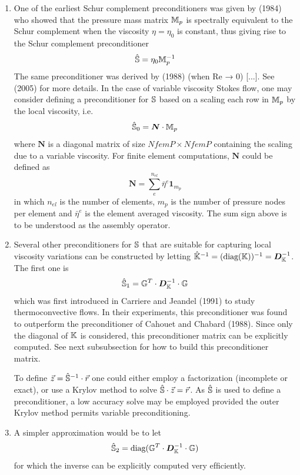 \begin{enumerate}
\item One of the earliest Schur complement preconditioners was given by 
\textcite{verf84} (1984) who showed that the pressure mass matrix 
${\mathbb{M}}_p$ is spectrally equivalent to the Schur complement when the viscosity 
$\eta=\eta_0$ is constant, thus giving rise to the Schur complement preconditioner
\[
\hat{{\mathbb{S}}}=\eta_0 {\mathbb{M}}_p^{-1}
\]
The same preconditioner was derived by \textcite{cach88} (1988) (when Re → 0) [...]. 
See \textcite{begl05} (2005) for more details. In the case of variable viscosity 
Stokes flow, one may consider defining a preconditioner 
for ${\mathbb{S}}$ based on a scaling each row in ${\mathbb{M}}_p$ by the local viscosity, i.e.
\[
\hat{{\mathbb{S}}}_0={\bm N} \cdot {\mathbb{M}}_p
\]
where ${\bm N}$ is a diagonal matrix of size $NfemP \times NfemP$ containing the scaling due to
a variable viscosity. For finite element computations, ${\bm N}$ could be defined as
\[
{\bm N} = \sum_e^{n_{el}} \bar{\eta}^e {\bm 1}_{m_p} 
\]
in which $n_{el}$ is the number of elements, $m_p$ is the number of pressure nodes per 
element and $ \bar{\eta}^e$ is the element averaged viscosity. The sum sign above is 
to be understood as the assembly operator.

\item Several other preconditioners for ${\mathbb{S}}$ that are suitable for capturing 
local viscosity variations can be constructed by letting 
$\hat{{\mathbb{K}}}^{-1}=(\text{diag}({\mathbb{K}}))^{-1} ={\bm D}_{\mathbb{K}}^{-1}$.
The first one is 
\[
\hat{{\mathbb{S}}}_1={\mathbb{G}}^T \cdot {\bm D}_{\mathbb{K}}^{-1} \cdot {\mathbb{G}}
\]
which was first introduced in Carriere and Jeandel (1991) to study thermoconvective ﬂows. 
In their experiments, this preconditioner was found to outperform the preconditioner 
of Cahouet and Chabard (1988). Since only the diagonal of ${\mathbb{K}}$ is considered, this preconditioner
matrix can be explicitly computed. 
See next subsubsection for how to build this preconditioner matrix.


To define $\vec{z} = \hat{{\mathbb{S}}}^{-1}\cdot \vec{r}$ one could
either employ a factorization (incomplete or exact), or use a Krylov
method to solve $\hat{{\mathbb{S}}} \cdot \vec{z}= \vec{r}$. As $\hat{{\mathbb{S}}}$ is used to define a preconditioner,
a low accuracy solve may be employed provided the outer Krylov method permits variable preconditioning.


\item A simpler approximation would be to let
\[
\hat{{\mathbb{S}}}_2 = \text{diag}( {\mathbb{G}}^T \cdot {\bm D}_{\mathbb{K}}^{-1} \cdot {\mathbb{G}})
\]
for which the inverse can be explicitly computed very efﬁciently.


\end{enumerate}
